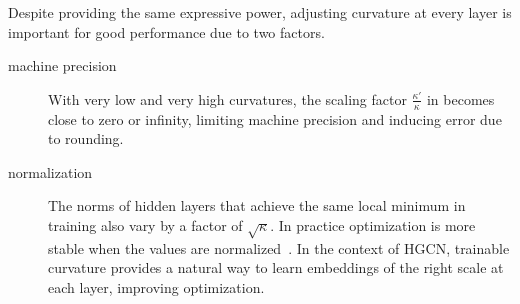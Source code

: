 Despite providing the same expressive power, adjusting curvature at every layer is important for good performance due to two factors.
\begin{description}
    \item[machine precision] With very low and very high curvatures, the scaling factor $\frac{\kappa'}{\kappa}$ in  becomes close to zero or infinity, limiting machine precision and inducing error due to rounding.
    \item[normalization] The norms of hidden layers that achieve the same local minimum in training also vary by a factor of $\sqrt{\kappa}$. In practice optimization is more stable when the values are normalized~\cite{ioffe2015batchNormalization}. In the context of HGCN, trainable curvature provides a natural way to learn embeddings of the right scale at each layer, improving optimization.
\end{description}